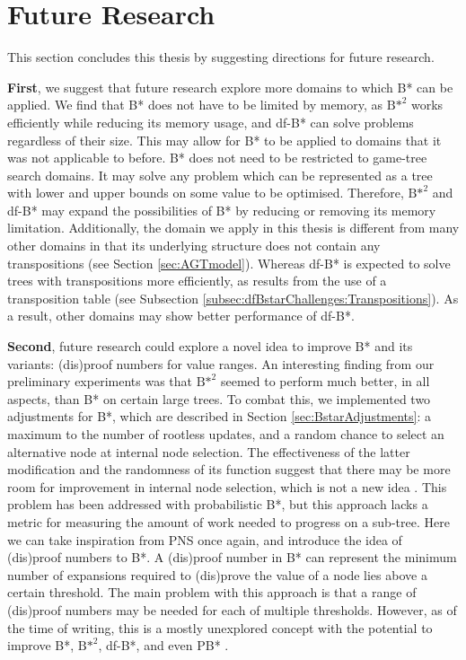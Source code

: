 \section{Future Research}
\label{sec:FutureResearch}
This section concludes this thesis by suggesting directions for future research.

\textbf{First}, we suggest that future research explore more domains to which B* can be applied. 
We find that B* does not have to be limited by memory, as ${\text{B*}}^2$ works efficiently while reducing its memory usage, and df-B* can solve problems regardless of their size. This may allow for B* to be applied to domains that it was not applicable to before. B* does not need to be restricted to game-tree search domains. It may solve any problem which can be represented as a tree with lower and upper bounds on some value to be optimised. Therefore, ${\text{B*}}^2$ and df-B* may expand the possibilities of B* by reducing or removing its memory limitation. Additionally, the domain we apply in this thesis is different from many other domains in that its underlying structure does not contain any transpositions (see Section \ref{sec:AGTmodel}). Whereas df-B* is expected to solve trees with transpositions more efficiently, as results from the use of a transposition table (see Subsection \ref{subsec:dfBstarChallenges:Transpositions}). As a result, other domains may show better performance of df-B*.

\textbf{Second}, future research could explore a novel idea to improve B* and its variants: (dis)proof numbers for value ranges. An interesting finding from our preliminary experiments was that ${\text{B*}}^2$ seemed to perform much better, in all aspects, than B* on certain large trees. To combat this, we implemented two adjustments for B*, which are described in Section \ref{sec:BstarAdjustments}: a maximum to the number of rootless updates, and a random chance to select an alternative node at internal node selection. The effectiveness of the latter modification and the randomness of its function suggest that there may be more room for improvement in internal node selection, which is not a new idea \cite{Palay1983, Berliner1996}. This problem has been addressed with probabilistic B*, but this approach lacks a metric for measuring the amount of work needed to progress on a sub-tree. Here we can take inspiration from PNS once again, and introduce the idea of (dis)proof numbers to B*. A (dis)proof number in B* can represent the minimum number of expansions required to (dis)prove the value of a node lies above a certain threshold. The main problem with this approach is that a range of (dis)proof numbers may be needed for each of multiple thresholds. However, as of the time of writing, this is a mostly unexplored concept with the potential to improve B*, ${\text{B*}}^2$, df-B*, and even PB* \cite{Palay1983}.

